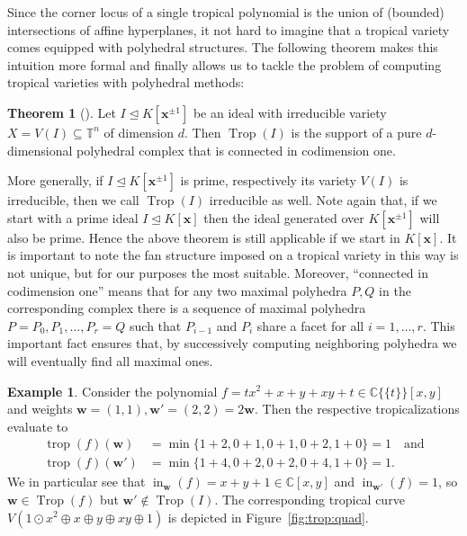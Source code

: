 \documentclass[
  paper=a4,
  titlepage,
  bibliography=totoc,
  listof=totoc,
  pagesize=pdftex
]{scrartcl}
\numberwithin{figure}{section}
\numberwithin{equation}{section}
\numberwithin{table}{section}
\newcommand*\setC{\mathds{C}}
\newcommand*\setT{\mathds{T}}
\newcommand*\puiseux[2]{#1\{\!\{#2\}\!\}}
\newcommand*\CCt{\puiseux{\setC}{t}}
\let\vec\mathbf
\let\idealof\trianglelefteq
\DeclareMathOperator{\Trop}{Trop}
\DeclareMathOperator{\trop}{trop}
\DeclareMathOperator{\initial}{in}
\theoremstyle{definition}
\newtheorem{theorem}[definition]{Theorem}
\newtheorem{example}[definition]{Example}
\numberwithin{definition}{section}
\begin{document}
Since the corner locus of a single tropical polynomial is the union of (bounded)
intersections of affine hyperplanes, it not hard to imagine that a tropical variety comes
equipped with polyhedral structures. The following theorem makes this intuition more
formal and finally allows us to tackle the problem of computing tropical varieties with
polyhedral methods:

\begin{theorem}[{\cite[Theorem~3.5.1]{sturmMacTrop}}]
  \label{thm:tropComplexConn}
  Let $I \idealof K[\vec x^{\pm1}]$ be an ideal with irreducible variety $X = V(I)
  \subseteq \setT^n$ of dimension $d$. Then $\Trop(I)$ is the support of a pure
  $d$-dimensional polyhedral complex that is connected in codimension one.
\end{theorem}

More generally, if $I \idealof K[\vec x^{\pm1}]$ is prime, respectively its variety $V(I)$
is irreducible, then we call $\Trop(I)$ irreducible as well. Note again that, if we start
with a prime ideal $I \idealof K[\vec x]$ then the ideal generated over $K[\vec x^{\pm1}]$
will also be prime. Hence the above theorem is still applicable if we start in $K[\vec
x]$. It is important to note the fan structure imposed on a tropical variety in this way
is not unique, but for our purposes the most suitable. Moreover, \enquote{connected in
codimension one} means that for any two maximal polyhedra $P, Q$ in the corresponding
complex there is a sequence of maximal polyhedra $P = P_0, P_1, \dots, P_r = Q$ such that
$P_{i-1}$ and $P_i$ share a facet for all $i = 1, \dots, r$. This important fact ensures
that, by successively computing neighboring polyhedra we will eventually find all maximal
ones.

\begin{example}
  \label{ex:notFan}
  Consider the polynomial $f = tx^2 + x + y + xy + t \in \CCt[x,y]$ and weights $\vec w =
  (1,1), \vec w' = (2,2) = 2 \vec w$. Then the respective tropicalizations evaluate to
  \begin{align*}
    \trop(f)(\vec w) &= \min \{ 1 + 2, 0 + 1, 0 + 1, 0 + 2, 1 + 0 \} = 1 \quad
    \text{and} \\
    \trop(f)(\vec w') &= \min \{ 1 + 4, 0 + 2, 0 + 2, 0 + 4, 1 + 0 \} = 1.
  \end{align*}
  We in particular see that $\initial_{\vec w}(f) = x+y+1 \in \setC[x,y]$ and
  $\initial_{\vec w'}(f) = 1$, so $\vec w \in \Trop(f)$ but $\vec w' \not\in \Trop(I)$.
  The corresponding tropical curve $V(1\odot x^2 \oplus x \oplus y \oplus xy \oplus 1)$ is
  depicted in Figure~\ref{fig:trop:quad}.
\end{example}
\end{document}

